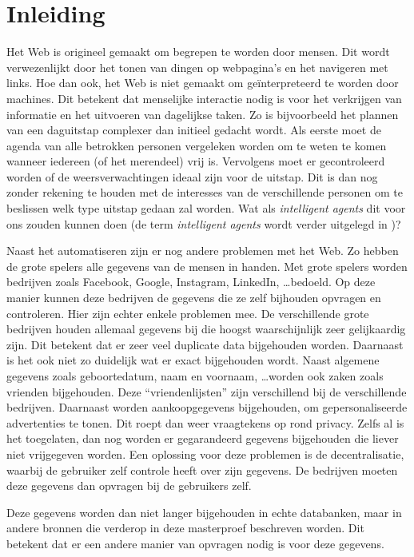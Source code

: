 \chapter{Inleiding}
Het Web is origineel gemaakt om begrepen te worden door mensen. Dit wordt verwezenlijkt door het tonen van dingen op webpagina's en het navigeren met links. Hoe dan ook, het Web is niet gemaakt om geïnterpreteerd te worden door machines. Dit betekent dat menselijke interactie nodig is voor het verkrijgen van informatie en het uitvoeren van dagelijkse taken. Zo is bijvoorbeeld het plannen van een daguitstap complexer dan initieel gedacht wordt. Als eerste moet de agenda van alle betrokken personen vergeleken worden om te weten te komen wanneer iedereen (of het merendeel) vrij is. Vervolgens moet er gecontroleerd worden of de weersverwachtingen ideaal zijn voor de uitstap. Dit is dan nog zonder rekening te houden met de interesses van de verschillende personen om te beslissen welk type uitstap gedaan zal worden. Wat als \textit{intelligent agents} dit voor ons zouden kunnen doen (de term \textit{intelligent agents} wordt verder uitgelegd in )?

Naast het automatiseren zijn er nog andere problemen met het Web. Zo hebben de grote spelers alle gegevens van de mensen in handen. Met grote spelers worden bedrijven zoals Facebook, Google, Instagram, LinkedIn, \dots bedoeld. Op deze manier kunnen deze bedrijven de gegevens die ze zelf bijhouden opvragen en controleren. Hier zijn echter enkele problemen mee. De verschillende grote bedrijven houden allemaal gegevens bij die hoogst waarschijnlijk zeer gelijkaardig zijn. Dit betekent dat er zeer veel duplicate data bijgehouden worden. Daarnaast is het ook niet zo duidelijk wat er exact bijgehouden wordt. Naast algemene gegevens zoals geboortedatum, naam en voornaam, \dots worden ook zaken zoals vrienden bijgehouden. Deze ``vriendenlijsten'' zijn verschillend bij de verschillende bedrijven. Daarnaast worden aankoopgegevens bijgehouden, om gepersonaliseerde advertenties te tonen. Dit roept dan weer vraagtekens op rond privacy. Zelfs al is het toegelaten, dan nog worden er gegarandeerd gegevens bijgehouden die liever niet vrijgegeven worden. Een oplossing voor deze problemen is de decentralisatie, waarbij de gebruiker zelf controle heeft over zijn gegevens. De bedrijven moeten deze gegevens dan opvragen bij de gebruikers zelf. 

Deze gegevens worden dan niet langer bijgehouden in echte databanken, maar in andere bronnen die verderop in deze masterproef beschreven worden. Dit betekent dat er een andere manier van opvragen nodig is voor deze gegevens.

